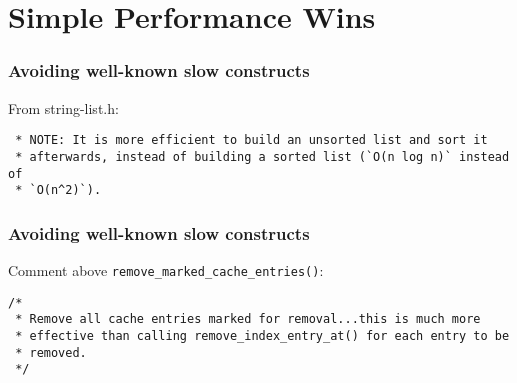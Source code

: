 \documentclass[compress,t]{beamer}
\begin{document}
\section[Simple Wins]{Simple Performance Wins}

\begin{frame}[fragile]
  \frametitle{Avoiding well-known slow constructs}

  From string-list.h:
  {\scriptsize
  \vspace*{-0.5\baselineskip}
  \begin{verbatim}
 * NOTE: It is more efficient to build an unsorted list and sort it
 * afterwards, instead of building a sorted list (`O(n log n)` instead of
 * `O(n^2)`).
  \end{verbatim}
  \vspace*{-\baselineskip}
  }

\end{frame}


\begin{frame}[fragile]
  \frametitle{Avoiding well-known slow constructs}

  Comment above \texttt{remove\_marked\_cache\_entries()}:
  {\scriptsize
  \vspace*{-0.5\baselineskip}
  \begin{verbatim}
/*
 * Remove all cache entries marked for removal...this is much more
 * effective than calling remove_index_entry_at() for each entry to be
 * removed.
 */
  \end{verbatim}
  }



\end{frame}
\end{document}
